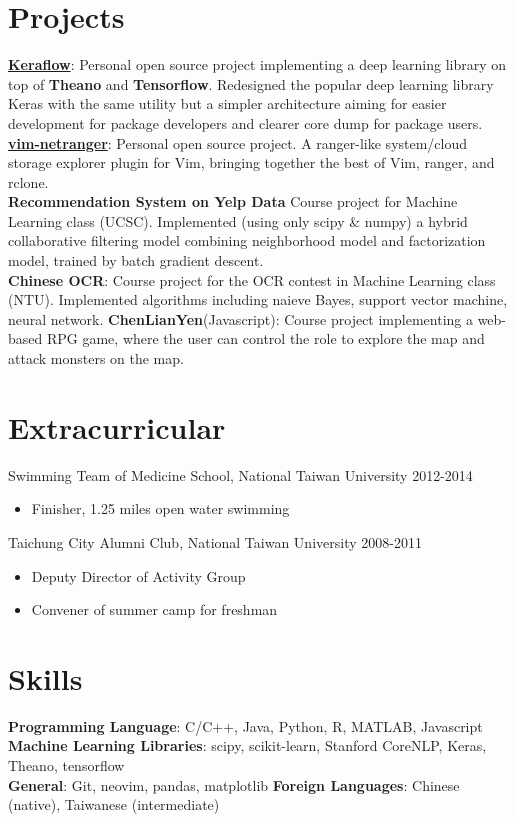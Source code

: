 \documentclass[a4paper,10pt]{article}
\begin{document}
\section{Projects}
\href{https://github.com/ipod825/keraflow}{\textbf{Keraflow}}: Personal open source project implementing a deep learning library on top of \textbf{Theano} and \textbf{Tensorflow}. Redesigned the popular deep learning library Keras with the same utility but a simpler architecture aiming for easier development for package developers and clearer core dump for package users. \\
\href{https://github.com/ipod825/vim-netranger}{\textbf{vim-netranger}}: Personal open source project. A ranger-like system/cloud storage explorer plugin for Vim, bringing together the best of Vim, ranger, and rclone.  \\
\textbf{Recommendation System on Yelp Data} Course project for Machine Learning class (UCSC). Implemented (using only scipy \& numpy) a hybrid collaborative filtering model combining neighborhood model and factorization model, trained by batch gradient descent. \\
\textbf{Chinese OCR}: Course project for the OCR contest in Machine Learning class (NTU). Implemented algorithms including naieve Bayes, support vector machine, neural network.
\textbf{ChenLianYen}(Javascript): Course project implementing a web-based RPG game, where the user can control the role to explore the map and attack monsters on the map.


\section{Extracurricular}
Swimming Team of Medicine School, National Taiwan University \hfill 2012-2014
\begin{itemize}
    \item Finisher, 1.25 miles open water swimming
\end{itemize}

Taichung City Alumni Club, National Taiwan University \hfill 2008-2011
\begin{itemize}
    \item Deputy Director of Activity Group
    \item Convener of summer camp for freshman
\end{itemize}

\section{Skills}
\textbf{Programming Language}: C/C++, Java, Python, R, MATLAB, Javascript \\
\textbf{Machine Learning Libraries}: scipy, scikit-learn, Stanford CoreNLP, Keras, Theano, tensorflow \\
\textbf{General}: Git, neovim, pandas, matplotlib 
\textbf{Foreign Languages}: Chinese (native), Taiwanese (intermediate)
\end{document}
